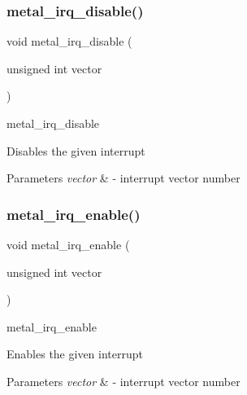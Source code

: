 \subsubsection{\texorpdfstring{metal\+\_\+irq\+\_\+disable()}{metal\_irq\_disable()}}
{\footnotesize\ttfamily void metal\+\_\+irq\+\_\+disable (\begin{DoxyParamCaption}\item[{unsigned int}]{vector }\end{DoxyParamCaption})}



metal\+\_\+irq\+\_\+disable 

Disables the given interrupt


\begin{DoxyParams}{Parameters}
{\em vector} & -\/ interrupt vector number \\
\hline
\end{DoxyParams}
\mbox{\label{group__irq_ga49be7c9623cd5bcb11c99542ee85bb97}} 
\subsubsection{\texorpdfstring{metal\+\_\+irq\+\_\+enable()}{metal\_irq\_enable()}}
{\footnotesize\ttfamily void metal\+\_\+irq\+\_\+enable (\begin{DoxyParamCaption}\item[{unsigned int}]{vector }\end{DoxyParamCaption})}



metal\+\_\+irq\+\_\+enable 

Enables the given interrupt


\begin{DoxyParams}{Parameters}
{\em vector} & -\/ interrupt vector number \\
\hline
\end{DoxyParams}
\mbox{\label{group__irq_gaa4e87537ea598b26d00cd2af070ce41c}} 
